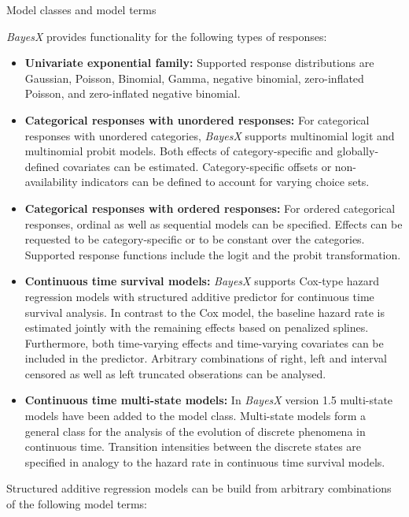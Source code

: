 \begin{stanza}{Model classes and model terms}

{\em BayesX} provides functionality for the following types of
responses:

\begin{itemize}
\item{\bf\sffamily Univariate exponential family:} Supported
response distributions are Gaussian, Poisson, Binomial, Gamma,
negative binomial, zero-inflated Poisson, and zero-inflated
negative binomial.

\item{\bf\sffamily Categorical responses with unordered
responses:} For categorical responses with unordered categories,
{\em BayesX} supports multinomial logit and multinomial probit
models. Both effects of category-specific and globally-defined
covariates can be estimated. Category-specific offsets or
non-availability indicators can be defined to account for varying
choice sets.

\item{\bf\sffamily Categorical responses with ordered responses:}
For ordered categorical responses, ordinal as well as sequential
models can be specified. Effects can be requested to be
category-specific or to be constant over the categories. Supported
response functions include the logit and the probit
transformation.

\item{\bf\sffamily Continuous time survival models:} {\em BayesX}
supports Cox-type hazard regression models with structured
additive predictor for continuous time survival analysis. In
contrast to the Cox model, the baseline hazard rate is estimated
jointly with the remaining effects based on penalized splines.
Furthermore, both time-varying effects and time-varying covariates
can be included in the predictor. Arbitrary combinations of right,
left and interval censored as well as left truncated obserations
can be analysed.

\item{\bf\sffamily Continuous time multi-state models:} In {\em
BayesX} version 1.5 multi-state models have been added to the
model class. Multi-state models form a general class for the
analysis of the evolution of discrete phenomena in continuous
time. Transition intensities between the discrete states are
specified in analogy to the hazard rate in continuous time
survival models.
\end{itemize}

Structured additive regression models can be build from arbitrary
combinations of the following model terms:


\end{stanza}
